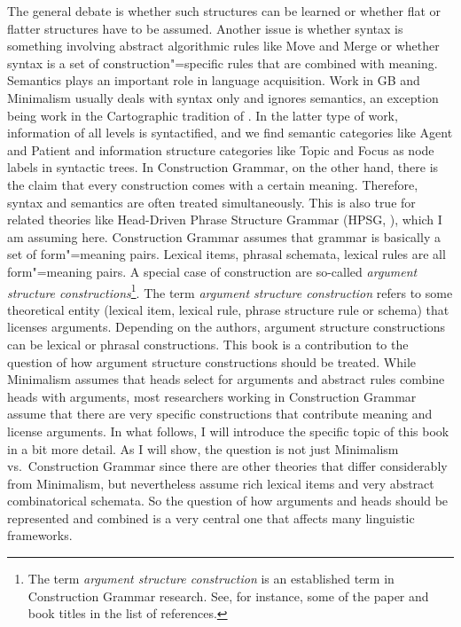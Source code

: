 The general debate is whether such structures can be learned or whether flat or flatter structures
have to be assumed. Another issue is whether syntax is something involving abstract algorithmic
rules like Move and Merge or whether syntax is a set of construction"=specific rules that are
combined with meaning. Semantics plays an important role in language acquisition. Work
in GB and Minimalism usually deals with syntax only and ignores semantics, an exception being work
in the Cartographic tradition of \citet{Rizzi97a-u}. In the latter type of work, information of all levels
is syntactified, and we find semantic categories like Agent and Patient and information structure
categories like Topic and Focus as node labels in syntactic trees. In Construction Grammar, on the
other hand, there is the claim that every construction comes with a certain meaning. Therefore,
syntax and semantics are often treated simultaneously. This is also true for related theories like
Head-Driven Phrase Structure Grammar (HPSG, ), which I am assuming here.
Construction Grammar assumes that grammar is basically a set of form"=meaning pairs. Lexical items,
phrasal schemata, lexical rules are all form"=meaning pairs. A special case of construction are
so-called \emph{argument structure constructions}\footnote{%
The term \emph{argument structure construction} is an established term in Construction Grammar
  research. See, for instance, some of the paper and book titles in the list of references.
}. The term \emph{argument structure construction} refers to some theoretical entity (lexical item,
lexical rule, phrase structure rule or schema) that licenses arguments. Depending on the authors,
argument structure constructions can be lexical or phrasal constructions. This book is a
contribution to the question of how argument structure constructions should be treated. While
Minimalism assumes that heads select for arguments and abstract rules combine heads with arguments,
most researchers working in Construction Grammar assume that there are very specific constructions
that contribute meaning and license arguments. In what follows, I will introduce the specific topic
of this book in a bit more detail. As I will show, the question is not just Minimalism
vs.\ Construction Grammar since there are other theories that differ considerably from Minimalism,
but nevertheless assume rich lexical items and very abstract combinatorical schemata. So the
question of how arguments and heads should be represented and combined is a very central one that
affects many linguistic frameworks.


